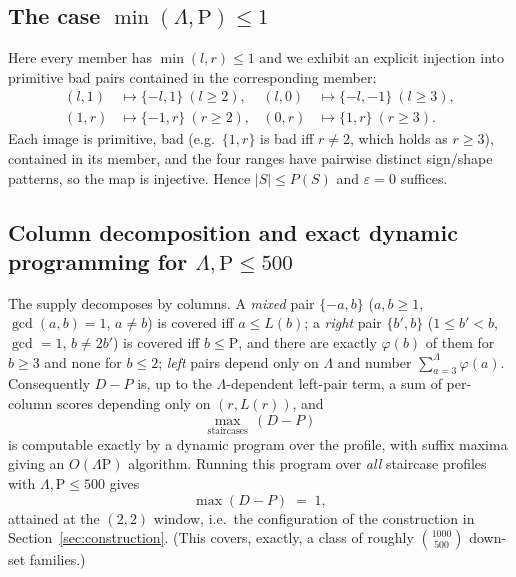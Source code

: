 \documentclass[11pt]{article}
\theoremstyle{definition}
\begin{document}
\subsection{\texorpdfstring{The case $\min(\Lambda,\mathrm{P})\le 1$}{The case min(Lambda,P) <= 1}}
Here every member has $\min(l,r)\le 1$ and we exhibit an explicit injection into primitive bad pairs contained in the corresponding member:
\begin{align*}
(l,1)&\mapsto\{-l,1\}\ (l\ge2), & (l,0)&\mapsto\{-l,-1\}\ (l\ge3),\\
(1,r)&\mapsto\{-1,r\}\ (r\ge2), & (0,r)&\mapsto\{1,r\}\ (r\ge3).
\end{align*}
Each image is primitive, bad (e.g.\ $\{1,r\}$ is bad iff $r\ne 2$, which holds as $r\ge 3$), contained in its member, and the four ranges have pairwise distinct sign/shape patterns, so the map is injective. Hence $|S|\le P(S)$ and $\varepsilon=0$ suffices.

\subsection{\texorpdfstring{Column decomposition and exact dynamic programming for $\Lambda,\mathrm{P}\le 500$}{Column decomposition and exact dynamic programming for Lambda,P <= 500}}\label{subsec:dp}
The supply decomposes by columns. A \emph{mixed} pair $\{-a,b\}$ ($a,b\ge1$, $\gcd(a,b)=1$, $a\ne b$) is covered iff $a\le L(b)$; a \emph{right} pair $\{b',b\}$ ($1\le b'<b$, $\gcd=1$, $b\ne 2b'$) is covered iff $b\le\mathrm{P}$, and there are exactly $\varphi(b)$ of them for $b\ge3$ and none for $b\le 2$; \emph{left} pairs depend only on $\Lambda$ and number $\sum_{a=3}^{\Lambda}\varphi(a)$. Consequently $D-P$ is, up to the $\Lambda$-dependent left-pair term, a sum of per-column scores depending only on $(r,L(r))$, and
\[ \max_{\text{staircases}}\,(D-P) \]
is computable exactly by a dynamic program over the profile, with suffix maxima giving an $O(\Lambda\mathrm{P})$ algorithm. Running this program over \emph{all} staircase profiles with $\Lambda,\mathrm{P}\le 500$ gives
\[ \max (D-P) \;=\; 1, \]
attained at the $(2,2)$ window, i.e.\ the configuration of the construction in Section~\ref{sec:construction}. (This covers, exactly, a class of roughly $\binom{1000}{500}$ down-set families.)
\end{document}
